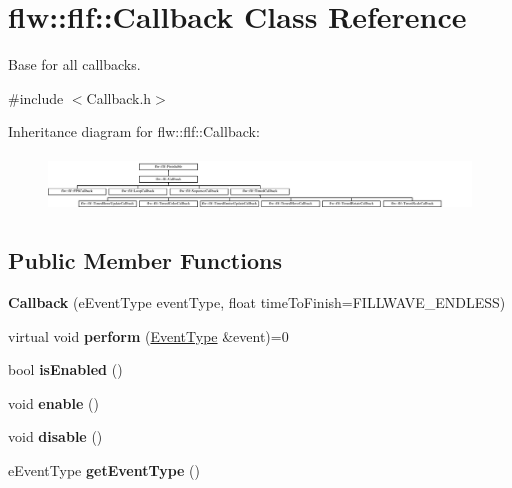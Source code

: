 \hypertarget{classflw_1_1flf_1_1Callback}{}\section{flw\+:\+:flf\+:\+:Callback Class Reference}
\label{classflw_1_1flf_1_1Callback}


Base for all callbacks.  




{\ttfamily \#include $<$Callback.\+h$>$}

Inheritance diagram for flw\+:\+:flf\+:\+:Callback\+:\begin{figure}[H]
\begin{center}
\leavevmode
\includegraphics[height=1.488372cm]{classflw_1_1flf_1_1Callback}
\end{center}
\end{figure}
\subsection*{Public Member Functions}
\begin{DoxyCompactItemize}
\item 
{\bfseries Callback} (e\+Event\+Type event\+Type, float time\+To\+Finish=F\+I\+L\+L\+W\+A\+V\+E\+\_\+\+E\+N\+D\+L\+E\+SS)\hypertarget{classflw_1_1flf_1_1Callback_a45c89125621559a762cb8db7daeda563}{}\label{classflw_1_1flf_1_1Callback_a45c89125621559a762cb8db7daeda563}

\item 
virtual void {\bfseries perform} (\hyperlink{classflw_1_1flf_1_1EventType}{Event\+Type} \&event)=0\hypertarget{classflw_1_1flf_1_1Callback_affe144f7a3ce0dc7c2179885cc09bef4}{}\label{classflw_1_1flf_1_1Callback_affe144f7a3ce0dc7c2179885cc09bef4}

\item 
bool {\bfseries is\+Enabled} ()\hypertarget{classflw_1_1flf_1_1Callback_ae2b84ec364130d0f67742977dc7ae12e}{}\label{classflw_1_1flf_1_1Callback_ae2b84ec364130d0f67742977dc7ae12e}

\item 
void {\bfseries enable} ()\hypertarget{classflw_1_1flf_1_1Callback_a554532ba63957be6ac732c9c22b9fb9e}{}\label{classflw_1_1flf_1_1Callback_a554532ba63957be6ac732c9c22b9fb9e}

\item 
void {\bfseries disable} ()\hypertarget{classflw_1_1flf_1_1Callback_aece7ca52d68e153a2f6e30e780887004}{}\label{classflw_1_1flf_1_1Callback_aece7ca52d68e153a2f6e30e780887004}

\item 
e\+Event\+Type {\bfseries get\+Event\+Type} ()\hypertarget{classflw_1_1flf_1_1Callback_a806ac8cee59307bb901866bdc82edd79}{}\label{classflw_1_1flf_1_1Callback_a806ac8cee59307bb901866bdc82edd79}

\end{DoxyCompactItemize}
